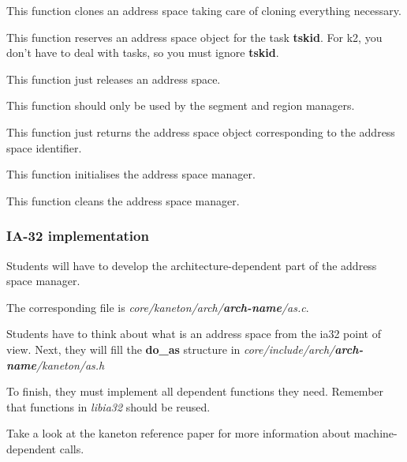 This function clones an address space taking care of cloning everything
necessary.


This  function   reserves  an  address  space  object   for  the  task
\textbf{tskid}. For k2, you don't have to deal with tasks, so you must
ignore \textbf{tskid}.


This function just  releases an address space.


This function should only be used by the segment and region managers.

This function just returns the address space object corresponding to
the address space identifier.


This function initialises the address space manager.


This function cleans the address space manager.

%
%

\subsubsection{IA-32 implementation}

Students will  have to develop the architecture-dependent  part of the
address space manager.

The corresponding file is \textit{core/kaneton/arch/\textbf{arch-name}/as.c}.

Students have  to think about what  is an address space  from the ia32
point of view.  Next, they will fill the \textbf{do\_as} structure in
\textit{core/include/arch/\textbf{arch-name}/kaneton/as.h}

To  finish,   they  must   implement  all  dependent   functions  they
need. Remember that functions in \textit{libia32} should be reused.

Take a look at the  kaneton reference paper for more information about
machine-dependent calls.

%
%

